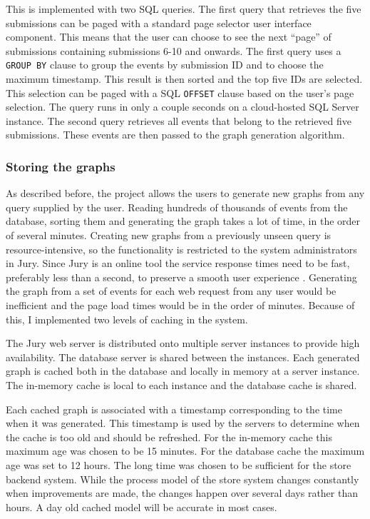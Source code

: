 This is implemented with two SQL queries.
The first query that retrieves the five submissions can be paged with a standard page selector user interface component.
This means that the user can choose to see the next ``page'' of submissions containing submissions 6-10 and onwards.
The first query uses a \texttt{GROUP BY} clause to group the events by submission ID and to choose the maximum timestamp.
This result is then sorted and the top five IDs are selected.
This selection can be paged with a SQL \texttt{OFFSET} clause based on the user's page selection.
The query runs in only a couple seconds on a cloud-hosted SQL Server instance.
The second query retrieves all events that belong to the retrieved five submissions.
These events are then passed to the graph generation algorithm.

\subsubsection{Storing the graphs}
\label{storinggraphs}

As described before, the project allows the users to generate new graphs from any query supplied by the user.
Reading hundreds of thousands of events from the database, sorting them and generating the graph takes a lot of time, in the order of several minutes.
Creating new graphs from a previously unseen query is resource-intensive, so the functionality is restricted to the system administrators in Jury. 
Since Jury is an online tool the service response times need to be fast, preferably less than a second, to preserve a smooth user experience \cite{nielsen1993usability}.
Generating the graph from a set of events for each web request from any user would be inefficient and the page load times would be in the order of minutes.
Because of this, I implemented two levels of caching in the system.

The Jury web server is distributed onto multiple server instances to provide high availability. The database server is shared between the instances.
Each generated graph is cached both in the database and locally in memory at a server instance.
The in-memory cache is local to each instance and the database cache is shared.

Each cached graph is associated with a timestamp corresponding to the time when it was generated. 
This timestamp is used by the servers to determine when the cache is too old and should be refreshed.
For the in-memory cache this maximum age was chosen to be 15 minutes.
For the database cache the maximum age was set to 12 hours.
The long time was chosen to be sufficient for the store backend system.
While the process model of the store system changes constantly when improvements are made, the changes happen over several days rather than hours. A day old cached model will be accurate in most cases.

